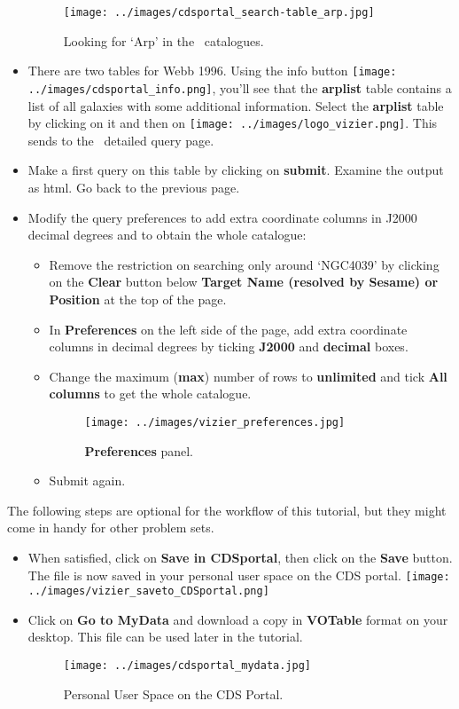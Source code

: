 \documentclass [a4paper, 12pt]{article}
\begin{document}
\begin{itemize}
\begin{figure}[H]
\center
\texttt{[image: ../images/cdsportal\_search-table\_arp.jpg]}
\caption{Looking for `Arp' in the \vizier\ catalogues.}
\label{fig:arp}
\end{figure}
\item There are two tables for Webb 1996. Using the info button
\texttt{[image: ../images/cdsportal\_info.png]}, you'll
see that the \textbf{arplist} table contains a list of all galaxies with some
additional information. Select the \textbf{arplist}
table by clicking on it and then on \texttt{[image: ../images/logo\_vizier.png]}. This sends to the \vizier\ detailed
query page.
\item Make a first query on this table by clicking on \textbf{submit}.
Examine the output as html. Go back to the previous page.
\item Modify the query preferences to add extra coordinate columns in
J2000 decimal degrees and to obtain the whole catalogue:
\begin{itemize}
    \item Remove the restriction on searching only around `NGC4039' by clicking
    on the \textbf{Clear} button below \textbf{Target Name (resolved by
        Sesame) or Position} at the top of the page.
    \item In \textbf{Preferences} on the left side of the page, add extra
    coordinate columns in decimal degrees by ticking \textbf{J2000} and
    \textbf{decimal} boxes.
    \item Change the maximum (\textbf{max}) number of rows to
    \textbf{unlimited} and tick \textbf{All columns} to get the whole
    catalogue.
    \begin{figure}[H]
        \center
        \texttt{[image: ../images/vizier\_preferences.jpg]}
        \caption{\textbf{Preferences} panel.}
        \label{fig:pref}
    \end{figure}
    \item Submit again.
\end{itemize}
\end{itemize}
The following steps are optional for the workflow of this tutorial, but they
might come in handy for other problem sets.
\begin{itemize}
\item When satisfied, click on \textbf{Save in CDSportal}, then click
on the \textbf{Save} button. The file is now saved in your personal
user space on the CDS portal. \texttt{[image: ../images/vizier\_saveto\_CDSportal.png]}
\item Click on \textbf{Go to MyData} and download a copy in
\textbf{VOTable} format on your desktop. This file can be used later
in the tutorial.
\begin{figure}[H]
\center
\texttt{[image: ../images/cdsportal\_mydata.jpg]}
\caption{Personal User Space on the CDS Portal.}
\label{fig:download}
\end{figure}
\end{itemize}
\end{document}
